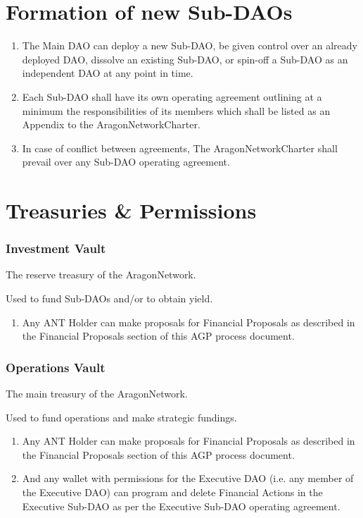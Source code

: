 \section{Formation of new Sub-DAOs}

\begin{enumerate}
	\item The Main \ac{DAO} can deploy a new Sub-\ac{DAO}, be given control over an already deployed \ac{DAO}, dissolve an existing Sub-\ac{DAO}, or spin-off a Sub-\ac{DAO} as an independent \ac{DAO} at any point in time.
	\item Each Sub-\ac{DAO} shall have its own operating agreement outlining at a minimum the responsibilities of its members which shall be listed as an Appendix to the \gls{AragonNetworkCharter}.
	\item In case of conflict between agreements, The \gls{AragonNetworkCharter} shall prevail over any Sub-\ac{DAO} operating agreement.
\end{enumerate}


\section{Treasuries \& Permissions}

\subsubsection*{Investment Vault} The reserve treasury of the \gls{AragonNetwork}.

Used to fund Sub-\acp{DAO} and/or to obtain yield.
\begin{enumerate}
	\item Any \ac{ANT} Holder can make proposals for Financial Proposals as described in the Financial Proposals section of this \ac{AGP} process document.
\end{enumerate}


\subsubsection*{Operations Vault} The main treasury of the \gls{AragonNetwork}.

Used to fund operations and make strategic fundings.
\begin{enumerate}
	\item Any \ac{ANT} Holder can make proposals for Financial Proposals as
	described in the Financial Proposals section of this \ac{AGP} process
	document.
	\item And any wallet with permissions for the Executive \ac{DAO} (i.e. any member of the Executive \ac{DAO}) can program and delete Financial Actions in the Executive Sub-\ac{DAO} as per the Executive Sub-\ac{DAO} operating agreement.
\end{enumerate}

